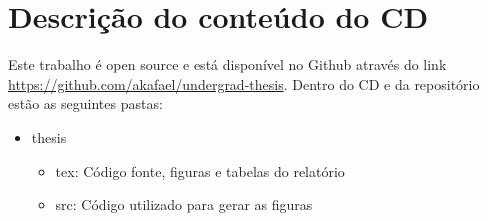 \chapter{Descrição do conteúdo do CD}

\label{AnCD}

Este trabalho é open source e está disponível no Github através do link \url{https://github.com/akafael/undergrad-thesis}. Dentro do CD e da repositório estão as seguintes pastas:

\begin{itemize}
    \item thesis
    \begin{itemize}
        \item tex: Código fonte, figuras e tabelas do relatório
        \item src: Código utilizado para gerar as figuras
    \end{itemize}
\end{itemize}
